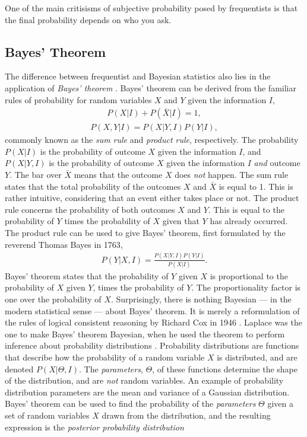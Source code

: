 \documentclass[twoside,english]{uiofysmaster}
\begin{document}
{One of the main critisisms of subjective probability posed by frequentists is that the final probability depends on who you ask.

\subsection{Bayes' Theorem}

The difference between frequentist and Bayesian statistics also lies in the application of \textit{Bayes' theorem} \cite{mr1763essay}. Bayes' theorem can be derived from the familiar rules of probability for random variables $X$ and $Y$ given the information $I$,
\begin{align}\label{Eq:: gaussian process : Sum rule}
P(X | I) + P(\bar{X} | I) = 1,
\end{align}
\begin{align}
 \label{Eq:: gaussian process : Product rule}
P(X, Y | I) = P(X | Y, I)  P(Y | I),
\end{align} 
commonly known as the \textit{sum rule} and \textit{product rule}, respectively. The probability $P(X|I)$ is the probability of outcome $X$ given the information $I$, and $P(X|Y,I)$ is the probability of outcome $X$ given the information $I$ \textit{and} outcome $Y$. The bar over $\bar{X}$ means that the outcome $X$ does \textit{not} happen. The sum rule states that the total probability of the outcomes $X$ and $\bar{X}$ is equal to 1. This is rather intuitive, considering that an event either takes place or not. The product rule concerns the probability of both outcomes $X$ and $Y$. This is equal to the probability of $Y$ times the probability of $X$ given that $Y$ has already occurred. The product rule can be used to give Bayes' theorem, first formulated by the reverend Thomas Bayes in 1763,
\begin{align}\label{Eq:: gaussian process : Bayes theorem}
P(Y | X, I) = \frac{P(X | Y, I)  P(Y | I)}{P(X | I)}.
\end{align}
Bayes' theorem states that the probability of $Y$ given $X$ is proportional to the probability of $X$ given $Y$, times the probability of $Y$. The proportionality factor is one over the probability of $X$. Surprisingly, there is nothing Bayesian --- in the modern statistical sense ---  about Bayes' theorem. It is merely a reformulation of the rules of logical consistent reasoning by Richard Cox in 1946 \cite{sivia2006data}. Laplace was the one to make Bayes' theorem Bayesian, when he used the theorem to perform inference about probability distributions \cite{laplace1820theorie}. Probability distributions are functions that describe how the probability of a random variable $X$ is distributed, and are denoted $P(X| \Theta, I)$. The \textit{parameters}, $\Theta$, of these functions determine the shape of the distribution, and are \textit{not} random variables. An example of probability distribution parameters are the mean and variance of a Gaussian distribution. Bayes' theorem can be used to find the probability of the \textit{parameters} $\Theta$ given a set of random variables  $X$ drawn from the distribution, and the resulting expression is the \textit{posterior probability distribution}
}
\end{document}
